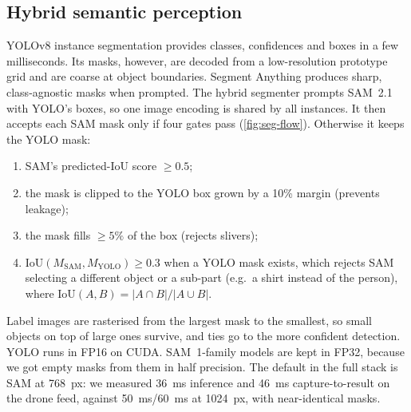\subsection{Hybrid semantic perception}
\label{sec:design-perception}

YOLOv8 instance segmentation \cite{redmon2016yolo,jocher2023yolov8} provides classes,
confidences and boxes in a few milliseconds. Its masks, however, are decoded from a
low-resolution prototype grid and are coarse at object boundaries. Segment Anything
\cite{kirillov2023sam,ravi2024sam2} produces sharp, class-agnostic masks when prompted.
The hybrid segmenter prompts SAM~2.1 with YOLO's boxes, so one image encoding is shared
by all instances. It then accepts each SAM mask only if four gates pass
(\cref{fig:seg-flow}). Otherwise it keeps the YOLO mask:
\begin{enumerate}[leftmargin=*,itemsep=1pt]
  \item SAM's predicted-IoU score $\ge 0.5$;
  \item the mask is clipped to the YOLO box grown by a 10\% margin (prevents leakage);
  \item the mask fills $\ge 5\%$ of the box (rejects slivers);
  \item $\text{IoU}(M_\text{SAM}, M_\text{YOLO}) \ge 0.3$ when a YOLO mask exists, which
    rejects SAM selecting a different object or a sub-part (e.g.\ a shirt instead of
    the person), where $\text{IoU}(A,B)=|A\cap B|/|A\cup B|$.
\end{enumerate}
Label images are rasterised from the largest mask to the smallest, so small objects on
top of large ones survive, and ties go to the more confident detection. YOLO runs in
FP16 on CUDA. SAM~1-family models are kept in FP32, because we got
empty masks from them in half precision. The default in the full stack is SAM at \SI{768}{px}: we
measured \SI{36}{\milli\second} inference and \SI{46}{\milli\second}
capture-to-result on the drone feed, against \SI{50}{\milli\second}/\SI{60}{\milli\second}
at \SI{1024}{px}, with near-identical masks.

